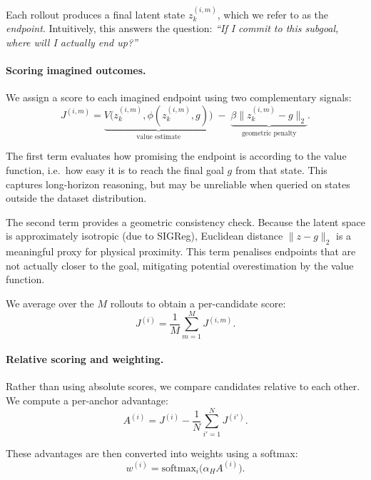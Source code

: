 Each rollout produces a final latent state $z_k^{(i,m)}$, which we refer
to as the \emph{endpoint}. Intuitively, this answers the question:
\emph{“If I commit to this subgoal, where will I actually end up?”}

\paragraph{Scoring imagined outcomes.}
We assign a score to each imagined endpoint using two complementary
signals:
\begin{equation}
J^{(i,m)} =
\underbrace{V\!\big(z_k^{(i,m)}, \phi(z_k^{(i,m)}, g)\big)}_{\text{value estimate}}
\;-\;
\underbrace{\beta \|z_k^{(i,m)} - g\|_2}_{\text{geometric penalty}}.
\label{eq:wgsp-J-clean}
\end{equation}

The first term evaluates how promising the endpoint is according to the
value function, i.e.\ how easy it is to reach the final goal $g$ from
that state. This captures long-horizon reasoning, but may be unreliable
when queried on states outside the dataset distribution.

The second term provides a geometric consistency check. Because the
latent space is approximately isotropic (due to SIGReg), Euclidean
distance $\|z - g\|_2$ is a meaningful proxy for physical proximity.
This term penalises endpoints that are not actually closer to the goal,
mitigating potential overestimation by the value function.

We average over the $M$ rollouts to obtain a per-candidate score:
\begin{equation}
J^{(i)} = \frac{1}{M} \sum_{m=1}^M J^{(i,m)}.
\end{equation}

\paragraph{Relative scoring and weighting.}
Rather than using absolute scores, we compare candidates relative to
each other. We compute a per-anchor advantage:
\begin{equation}
A^{(i)} = J^{(i)} - \frac{1}{N} \sum_{i'=1}^N J^{(i')}.
\end{equation}

These advantages are then converted into weights using a softmax:
\begin{equation}
w^{(i)} = \mathrm{softmax}_i\!\big(\alpha_H A^{(i)}\big).
\label{eq:wgsp-w-clean}
\end{equation}

